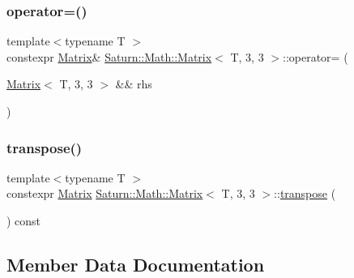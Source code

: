 \subsubsection{\texorpdfstring{operator=()}{operator=()}\hspace{0.1cm}{\footnotesize\ttfamily [2/2]}}
{\footnotesize\ttfamily template$<$typename T $>$ \\
constexpr \mbox{\hyperlink{class_saturn_1_1_math_1_1_matrix}{Matrix}}\& \mbox{\hyperlink{class_saturn_1_1_math_1_1_matrix}{Saturn\+::\+Math\+::\+Matrix}}$<$ T, 3, 3 $>$\+::operator= (\begin{DoxyParamCaption}\item[{\mbox{\hyperlink{class_saturn_1_1_math_1_1_matrix}{Matrix}}$<$ T, 3, 3 $>$ \&\&}]{rhs }\end{DoxyParamCaption})\hspace{0.3cm}{\ttfamily [inline]}}

\mbox{\label{class_saturn_1_1_math_1_1_matrix_3_01_t_00_013_00_013_01_4_a54ffe93160c1ffe2e8cc4434b6dc2382}} 
\subsubsection{\texorpdfstring{transpose()}{transpose()}}
{\footnotesize\ttfamily template$<$typename T $>$ \\
constexpr \mbox{\hyperlink{class_saturn_1_1_math_1_1_matrix}{Matrix}} \mbox{\hyperlink{class_saturn_1_1_math_1_1_matrix}{Saturn\+::\+Math\+::\+Matrix}}$<$ T, 3, 3 $>$\+::\mbox{\hyperlink{glad_8h_a7ad291818ab127e386dec37f7e1bdb97}{transpose}} (\begin{DoxyParamCaption}{ }\end{DoxyParamCaption}) const\hspace{0.3cm}{\ttfamily [inline]}}



\subsection{Member Data Documentation}
\mbox{\label{class_saturn_1_1_math_1_1_matrix_3_01_t_00_013_00_013_01_4_a6aaca5d7ab1d60b436c7f8076d2c8b06}} 

